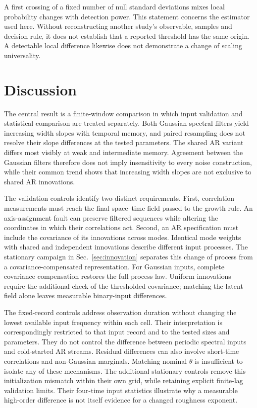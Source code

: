 A first crossing of a fixed number of null standard deviations mixes local
probability changes with detection power. This statement concerns the estimator
used here. Without reconstructing another study's observable, samples and
decision rule, it does not establish that a reported threshold has the same
origin. A detectable local difference likewise does not demonstrate a change
of scaling universality.



\section{Discussion}
The central result is a finite-window comparison in which input validation
and statistical comparison are treated separately. Both Gaussian spectral
filters yield increasing width slopes with temporal memory, and paired
resampling does not resolve their slope differences at the tested parameters.
The shared AR variant differs most visibly at weak and intermediate memory.
Agreement between the Gaussian filters therefore does not imply insensitivity
to every noise construction, while their common trend shows that increasing
width slopes are not exclusive to shared AR innovations.

The validation controls identify two distinct requirements. First, correlation
measurements must reach the final space--time field passed to the growth rule.
An axis-assignment fault can preserve filtered sequences while altering the
coordinates in which their correlations act. Second, an AR specification must
include the covariance of its innovations across modes. Identical mode weights
with shared and independent innovations describe different input processes.
The stationary campaign in Sec.~\ref{sec:innovation} separates this change
of process from a covariance-compensated representation. For Gaussian inputs,
complete covariance compensation restores the full process law. Uniform
innovations require the additional check of the thresholded covariance;
matching the latent field alone leaves measurable binary-input differences.

The fixed-record controls address observation duration without changing the
lowest available input frequency within each cell. Their interpretation is
correspondingly restricted to that input record and to the tested sizes and
parameters. They do not control the difference between periodic spectral
inputs and cold-started AR streams. Residual differences can also involve
short-time correlations and non-Gaussian marginals. Matching nominal $\theta$
is insufficient to isolate any of these mechanisms. The additional stationary
controls remove this initialization mismatch within their own grid, while
retaining explicit finite-lag validation limits. Their four-time input
statistics illustrate why a measurable high-order difference is not itself
evidence for a changed roughness exponent.

